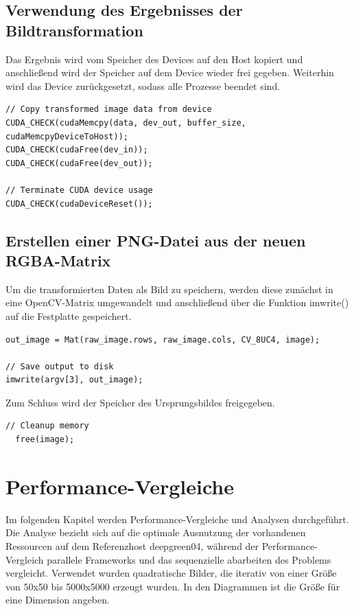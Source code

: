 \documentclass{llncs}
\begin{document}
%
\subsection{Verwendung des Ergebnisses der Bildtransformation}
%
Das Ergebnis wird vom Speicher des Devices auf den Host kopiert und anschließend wird der Speicher auf dem Device wieder frei gegeben. Weiterhin wird das Device zurückgesetzt, sodass alle Prozesse beendet sind.\\
\newpage
\begin{lstlisting}
// Copy transformed image data from device
CUDA_CHECK(cudaMemcpy(data, dev_out, buffer_size, cudaMemcpyDeviceToHost));
CUDA_CHECK(cudaFree(dev_in));
CUDA_CHECK(cudaFree(dev_out));

// Terminate CUDA device usage
CUDA_CHECK(cudaDeviceReset());
\end{lstlisting}

%
\subsection{Erstellen einer PNG-Datei aus der neuen RGBA-Matrix}
%
Um die transformierten Daten als Bild zu speichern, werden diese zunächst in eine OpenCV-Matrix umgewandelt und anschließend über die Funktion imwrite() auf die Festplatte gespeichert.

\begin{lstlisting}
out_image = Mat(raw_image.rows, raw_image.cols, CV_8UC4, image);

// Save output to disk
imwrite(argv[3], out_image);
\end{lstlisting}

Zum Schluss wird der Speicher des Ursprungsbildes freigegeben.

\begin{lstlisting}
// Cleanup memory
  free(image);
\end{lstlisting}


%
\section{Performance-Vergleiche}
%

Im folgenden Kapitel werden Performance-Vergleiche und Analysen durchgeführt. Die Analyse bezieht sich auf die optimale Ausnutzung der vorhandenen Ressourcen auf dem Referenzhost deepgreen04, während der Performance-Vergleich parallele Frameworks und das sequenzielle abarbeiten des Problems vergleicht.  Verwendet wurden quadratische Bilder, die iterativ von einer Größe von 50x50 bis 5000x5000 erzeugt wurden. In den Diagrammen ist die Größe für eine Dimension angeben.
\end{document}
